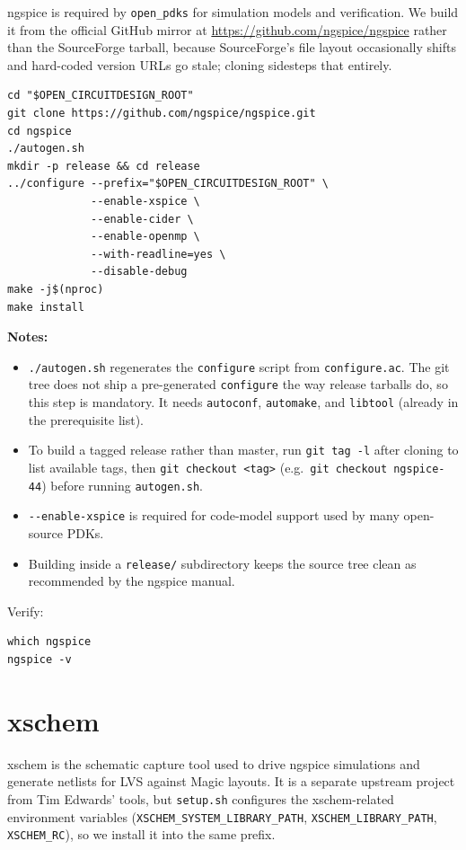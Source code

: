 \documentclass[11pt]{article}
\begin{document}
ngspice is required by \texttt{open\_pdks} for simulation models and
verification. We build it from the official GitHub mirror at
\url{https://github.com/ngspice/ngspice} rather than the SourceForge
tarball, because SourceForge's file layout occasionally shifts and
hard-coded version URLs go stale; cloning sidesteps that entirely.

\begin{lstlisting}
cd "$OPEN_CIRCUITDESIGN_ROOT"
git clone https://github.com/ngspice/ngspice.git
cd ngspice
./autogen.sh
mkdir -p release && cd release
../configure --prefix="$OPEN_CIRCUITDESIGN_ROOT" \
             --enable-xspice \
             --enable-cider \
             --enable-openmp \
             --with-readline=yes \
             --disable-debug
make -j$(nproc)
make install
\end{lstlisting}

\noindent\textbf{Notes:}
\begin{itemize}[leftmargin=2em]
  \item \texttt{./autogen.sh} regenerates the \texttt{configure} script
        from \texttt{configure.ac}. The git tree does not ship a
        pre-generated \texttt{configure} the way release tarballs do, so
        this step is mandatory. It needs \texttt{autoconf},
        \texttt{automake}, and \texttt{libtool} (already in the
        prerequisite list).
  \item To build a tagged release rather than master, run
        \texttt{git tag -l} after cloning to list available tags, then
        \texttt{git checkout <tag>} (e.g.\ \texttt{git checkout ngspice-44})
        before running \texttt{autogen.sh}.
  \item \texttt{-{}-enable-xspice} is required for code-model support used by
        many open-source PDKs.
  \item Building inside a \texttt{release/} subdirectory keeps the source
        tree clean as recommended by the ngspice manual.
\end{itemize}

Verify:

\begin{lstlisting}
which ngspice
ngspice -v
\end{lstlisting}

\section{xschem}

xschem is the schematic capture tool used to drive ngspice simulations and
generate netlists for LVS against Magic layouts. It is a separate upstream
project from Tim Edwards' tools, but \texttt{setup.sh} configures the
xschem-related environment variables
(\texttt{XSCHEM\_SYSTEM\_LIBRARY\_PATH}, \texttt{XSCHEM\_LIBRARY\_PATH},
\texttt{XSCHEM\_RC}), so we install it into the same prefix.
\end{document}
